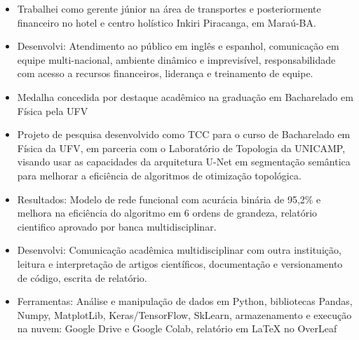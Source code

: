 \documentclass[10pt,a4paper,ragged2e]{altacv}
\begin{document}
\divider

\begin{itemize}

\item Trabalhei como gerente júnior na área de transportes e posteriormente financeiro no hotel e centro holístico Inkiri Piracanga, em Maraú-BA.
\item Desenvolvi: Atendimento ao público em inglês e espanhol, comunicação em equipe multi-nacional, ambiente dinâmico e imprevisível, responsabilidade com acesso a recursos financeiros, liderança e treinamento de equipe.

\end{itemize}

\begin{itemize}
\item Medalha concedida por destaque acadêmico na graduação em Bacharelado em Física pela UFV
\end{itemize}

\begin{itemize}
\item Projeto de pesquisa desenvolvido como TCC para o curso de Bacharelado em Física da UFV, em parceria com o Laboratório de Topologia da UNICAMP, visando usar as capacidades da arquitetura U-Net em segmentação semântica para melhorar a eficiência de algoritmos de otimização topológica. \\
\item Resultados: Modelo de rede funcional com acurácia binária de 95,2\% e melhora na eficiência do algoritmo em 6 ordens de grandeza, relatório cientifico aprovado por banca multidisciplinar. \\
\item Desenvolvi: Comunicação acadêmica multidisciplinar com outra instituição, leitura e interpretação de artigos científicos, documentação e versionamento de código, escrita de relatório. \\
\item Ferramentas: Análise e manipulação de dados em Python, bibliotecas Pandas, Numpy, MatplotLib, Keras/TensorFlow, SkLearn, armazenamento e execução na nuvem: Google Drive e Google Colab, relatório em LaTeX no OverLeaf   \\

\end{itemize}
\end{document}
